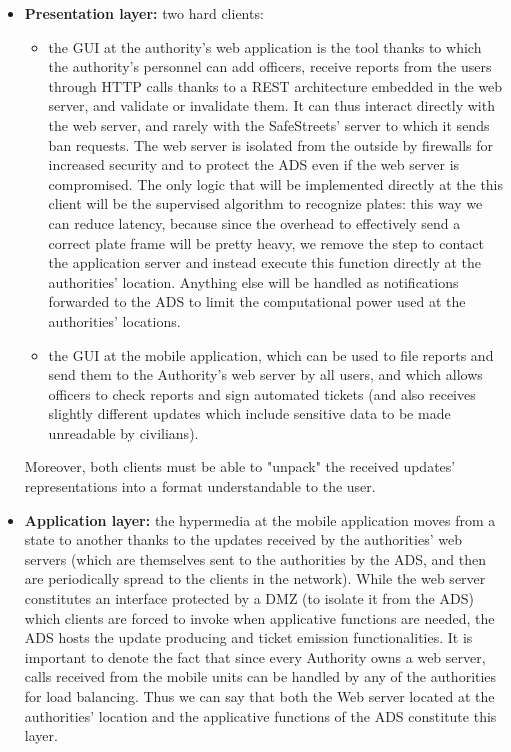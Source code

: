 \documentclass[12pt,a4paper]{article}
\begin{document}
\begin{itemize}
\item \textbf{Presentation layer:} two hard clients:
\begin{itemize}
\item the GUI at the authority's web application is the tool thanks to which the authority's personnel can add officers, receive reports from the users through HTTP calls thanks to a REST architecture embedded in the web server, and validate or invalidate them. It can thus interact directly with the web server, and rarely with the SafeStreets' server to which it sends ban requests. The web server is isolated from the outside by firewalls for increased security and to protect the ADS even if the web server is compromised. The only logic that will be implemented directly at the this client will be the supervised algorithm to recognize plates: this way we can reduce latency, because since the overhead to effectively send a correct plate frame will be pretty heavy, we remove the step to contact the application server and instead execute this function directly at the authorities' location. Anything else will be handled as notifications forwarded to the ADS to limit the computational power used at the authorities' locations.
\item the GUI at the mobile application, which can be used to file reports and send them to the Authority's web server by all users, and which allows officers to check reports and sign automated tickets (and also receives slightly different updates which
include sensitive data to be made unreadable by civilians). 
\end{itemize}
Moreover, both clients must be able to "unpack" the received updates' representations into a format understandable to the user.
\item \textbf{Application layer:} the hypermedia at the mobile application moves from a state to another thanks to the updates received by the authorities' web servers (which are themselves sent to the authorities by the ADS, and then are periodically spread to the clients in the network). While the web server constitutes an interface protected by a DMZ (to isolate it from the ADS) which clients are forced to invoke when applicative functions are needed, the ADS hosts the update producing and ticket emission functionalities. It is important to denote the fact that since every Authority owns a web server, calls received from the mobile units can be handled by any of the authorities for load balancing.  Thus we can say that both the Web server located at the authorities' location and the applicative functions of the ADS constitute this layer. 

\end{itemize}
\end{document}
